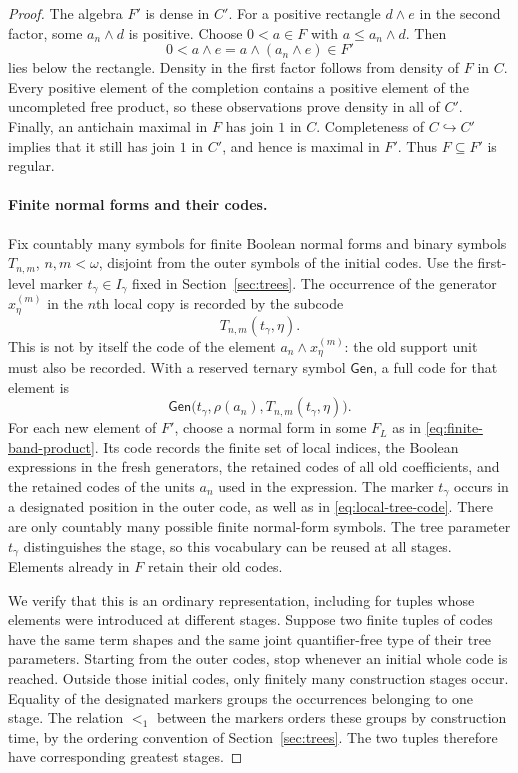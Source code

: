 \documentclass[11pt]{article}
\theoremstyle{definition}
\theoremstyle{remark}
\begin{document}
\begin{proof}
The algebra $F'$ is dense in $C'$.  For a positive rectangle $d\wedge e$
in the second factor, some $a_n\wedge d$ is positive.  Choose
$0<a\in F$ with $a\leq a_n\wedge d$.  Then
\[
 0<a\wedge e=a\wedge(a_n\wedge e)\in F'
\]
lies below the rectangle.  Density in the first factor follows from
density of $F$ in $C$.  Every positive element of the completion contains
a positive element of the uncompleted free product, so these observations
prove density in all of $C'$.
Finally, an antichain maximal in $F$ has join $1$ in $C$.  Completeness of
$C\hookrightarrow C'$ implies that it still has join $1$ in $C'$, and
hence is maximal in $F'$.  Thus $F\subseteq F'$ is regular.

\paragraph{Finite normal forms and their codes.}
Fix countably many symbols for finite Boolean normal forms and binary
symbols $T_{n,m}$, $n,m<\omega$, disjoint from the outer symbols of the initial
codes.  Use the first-level marker $t_\gamma\in I_\gamma$ fixed in
Section~\ref{sec:trees}.  The occurrence of the generator
$x_\eta^{(m)}$ in the $n$th local copy is recorded by the subcode
\begin{equation}\label{eq:local-tree-code}
 T_{n,m}(t_\gamma,\eta).
\end{equation}
This is not by itself the code of the element $a_n\wedge x_\eta^{(m)}$:
the old support unit must also be recorded.  With a reserved ternary
symbol $\mathsf{Gen}$, a full code for that element is
\[
 \mathsf{Gen}\bigl(t_\gamma,\rho(a_n),
                         T_{n,m}(t_\gamma,\eta)\bigr).
\]
For each new element of $F'$, choose a normal form in some $F_L$ as in
\eqref{eq:finite-band-product}.  Its code records the finite set of local
indices, the Boolean expressions in the fresh generators, the retained
codes of all old coefficients, and the retained codes of the units $a_n$
used in the expression.  The marker $t_\gamma$ occurs in a designated
position in the outer code, as well as in
\eqref{eq:local-tree-code}.  There are only countably many possible finite
normal-form symbols.  The tree parameter $t_\gamma$ distinguishes the
stage, so this vocabulary can be reused at all stages.  Elements already
in $F$ retain their old codes.

We verify that this is an ordinary representation, including for tuples
whose elements were introduced at different stages.  Suppose two finite
tuples of codes have the same term shapes and the same joint
quantifier-free type of their tree parameters.  Starting from the outer
codes, stop whenever an initial whole code is reached.  Outside those
initial codes, only finitely many construction stages occur.  Equality of
the designated markers groups the occurrences belonging to one stage.
The relation $<_1$ between the markers orders these groups by construction
time, by the ordering convention of Section~\ref{sec:trees}.  The two
tuples therefore have corresponding greatest stages.


\end{proof}
\end{document}
